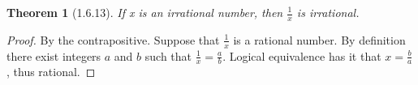 \documentclass[a4paper, 12pt]{article}
\theoremstyle{plain}
\newtheorem*{theorem*}{Theorem}
\begin{document}
	
	\begin{theorem*}[1.6.13]
		If x is an irrational number, then $\frac{1}{x}$ is irrational.
	\end{theorem*}
	
	\begin{proof}
		By the contrapositive. Suppose that $\frac{1}{x}$ is a rational number. By definition there exist 
		integers $a$ and $b$ such that  $\frac{1}{x} = \frac{a}{b}$. Logical equivalence has it that 
		$x = \frac{b}{a}$, thus rational.
	\end{proof}
\end{document}
